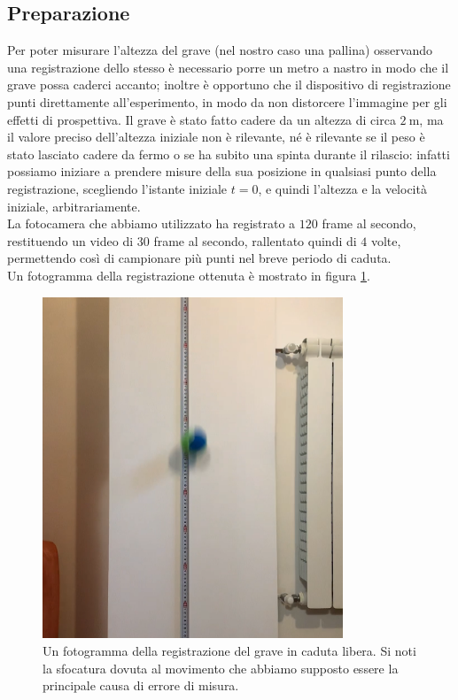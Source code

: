 \documentclass[a4paper]{article}
\begin{document}
    \subsection{Preparazione}
    Per poter misurare l'altezza del grave (nel nostro caso una pallina) osservando una registrazione dello stesso
        è necessario porre un metro a nastro in modo che il grave possa caderci accanto;
        inoltre è opportuno che il dispositivo di registrazione punti direttamente
        all'esperimento, in modo da non distorcere l'immagine per gli effetti di prospettiva.
        Il grave è stato fatto cadere da un altezza di circa $\SI{2}{\m}$, ma il valore
        preciso dell'altezza iniziale non è rilevante, né è rilevante se il peso è stato
        lasciato cadere da fermo o se ha subito una spinta durante il rilascio: infatti
        possiamo iniziare a prendere misure della sua posizione in qualsiasi punto della
        registrazione, scegliendo l'istante iniziale $t=0$, e quindi l'altezza e la
        velocità iniziale, arbitrariamente.\\
        La fotocamera che abbiamo utilizzato ha registrato a $120$ frame al secondo, 
        restituendo un video di $30$ frame al secondo, rallentato quindi di $4$ volte,
        permettendo così di campionare più punti nel breve periodo di caduta.\\
        Un fotogramma della registrazione ottenuta è mostrato in figura \ref{fig:fotogramma}.
        \begin{figure}[ht!]
            \centering
            \includegraphics[width=0.8\textwidth]{extra/fotogramma.png}
            \caption{Un fotogramma della registrazione del grave in caduta libera.
            Si noti la sfocatura dovuta al movimento che abbiamo supposto essere la
            principale causa di errore di misura.}
            \label{fig:fotogramma}
        \end{figure}
\end{document}
